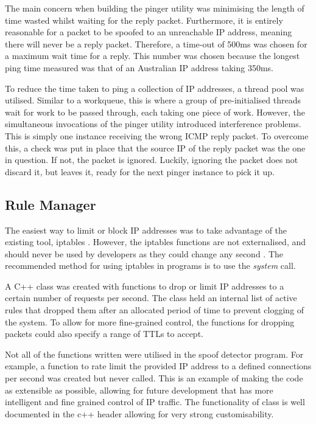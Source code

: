 \documentclass[12pt,twoside]{article}
\begin{document}
The main concern when building the pinger utility was minimising the length of time wasted whilst waiting for the reply packet. Furthermore, it is entirely reasonable for a packet to be spoofed to an unreachable IP address, meaning there will never be a reply packet. Therefore, a time-out of 500ms was chosen for a maximum wait time for a reply. This number was chosen because the longest ping time measured was that of an Australian IP address taking 350ms. 

To reduce the time taken to ping a collection of IP addresses, a thread pool was utilised. Similar to a workqueue, this is where a group of pre-initialised threads wait for work to be passed through, each taking one piece of work. However, the simultaneous invocations of the pinger utility introduced interference problems. This is simply one instance receiving the wrong ICMP reply packet. To overcome this, a check was put in place that the source IP of the reply packet was the one in question. If not, the packet is ignored. Luckily, ignoring the packet does not discard it, but leaves it, ready for the next pinger instance to pick it up.

\subsection{Rule Manager}
The easiest way to limit or block IP addresses was to take advantage of the existing tool, iptables \cite{iptables}. However, the iptables functions are not externalised, and should never be used by developers as they could change any second \cite{iptablesapi}. The recommended method for using iptables in programs is to use the \textit{system\(\)} call.

A C++ class was created with functions to drop or limit IP addresses to a certain number of requests per second. The class held an internal list of active rules that dropped them after an allocated period of time to prevent clogging of the system. To allow for more fine-grained control, the functions for dropping packets could also specify a range of TTLs to accept.

Not all of the functions written were utilised in the spoof detector program. For example, a function to rate limit the provided IP address to a defined connections per second was created but never called. This is an example of making the code as extensible as possible, allowing for future development that has more intelligent and fine grained control of IP traffic. The functionality of class is well documented in the c++ header allowing for very strong customisability.
\end{document}
